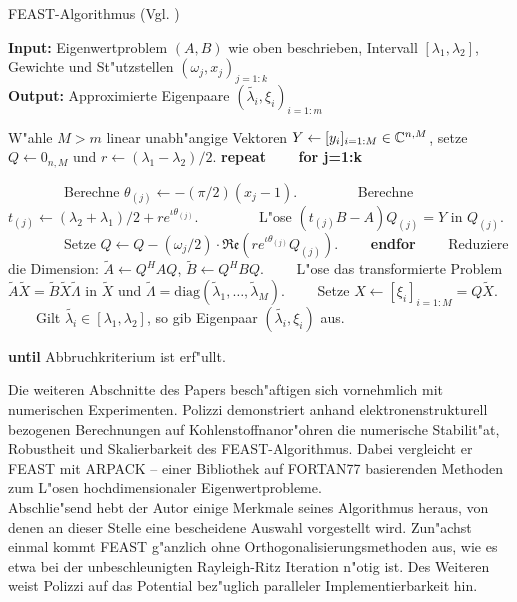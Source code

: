 \newpage

\begin{algorithm}
\caption{FEAST-Algorithmus (Vgl. \cite[Abschnitt III]{polizzi})}\label{alg:chap4:feast}
\textbf{Input:} Eigenwertproblem $(A,B)$ wie oben beschrieben, Intervall $[\lambda_1,\lambda_2]$, Gewichte und St"utzstellen $(\omega_j, x_j)_{j=1:k}$\\
\textbf{Output:} Approximierte Eigenpaare $(\widetilde{\lambda_i},\xi_i)_{i=1:m}$
\begin{algorithmic}[1]
\State W"ahle $M > m$ linear unabh"angige Vektoren $Y \gets [y_i]_{i=1:M} \in\mathbb{C}^{n,M}$, setze $Q\gets 0_{n,M}$ und $r\gets (\lambda_1 - \lambda_2)/2$.
\State \textbf{repeat}
\State \ \ \ \ \textbf{for j=1:k}

\State \ \ \ \ \ \ \ \ Berechne $\theta_{(j)} \gets -(\pi/2)(x_j-1)$.
\State \ \ \ \ \ \ \ \ Berechne $t_{(j)} \gets (\lambda_2 + \lambda_1)/2 + re^{\iota\theta_{(j)}}$.
\State \ \ \ \ \ \ \ \ L"ose $(t_{(j)} B-A)Q_{(j)} = Y$ in $Q_{(j)}$.
\State \ \ \ \ \ \ \ \ Setze $Q\gets Q - (\omega_j/2)\cdot\mathfrak{Re}\left(re^{\iota \theta_{(j)}} Q_{(j)}\right)$.
\State \ \ \ \ \textbf{endfor}
\State \ \ \ \ Reduziere die Dimension: $\widetilde{A} \gets Q^H A Q$,
$\widetilde{B} \gets Q^H B Q$.
\State \ \ \ \ L"ose das transformierte Problem $\widetilde{A}\widetilde{X}
= \widetilde{B}\widetilde{X}\widetilde{\Lambda}$ in
$\widetilde{X}$ und $\widetilde{\Lambda} = \text{diag}(\widetilde{\lambda}_1,\ldots,\widetilde{\lambda}_M)$.
\State \ \ \ \ Setze $X \gets [\xi_i]_{i=1:M} = Q\widetilde{X}$.
\State \ \ \ \ Gilt $\widetilde{\lambda_i} \in [\lambda_1,\lambda_2]$, so gib Eigenpaar $(\widetilde{\lambda_i},\xi_i)$ aus.

\State \textbf{until} Abbruchkriterium ist erf"ullt.
\end{algorithmic}
\end{algorithm}

Die weiteren Abschnitte des Papers besch"aftigen sich vornehmlich mit numerischen Experimenten. Polizzi demonstriert anhand elektronenstrukturell bezogenen Berechnungen auf Kohlenstoffnanor"ohren die numerische Stabilit"at, Robustheit und Skalierbarkeit des FEAST-Algorithmus. Dabei vergleicht er FEAST mit ARPACK -- einer Bibliothek auf FORTAN77 basierenden Methoden zum L"osen hochdimensionaler Eigenwertprobleme.\\

Abschlie"send hebt der Autor einige Merkmale seines Algorithmus heraus, von denen an dieser Stelle eine bescheidene Auswahl vorgestellt wird. Zun"achst einmal kommt FEAST g"anzlich ohne Orthogonalisierungsmethoden aus, wie es etwa bei der unbeschleunigten Rayleigh-Ritz Iteration n"otig ist. Des Weiteren weist Polizzi auf das Potential bez"uglich paralleler Implementierbarkeit hin.\\

